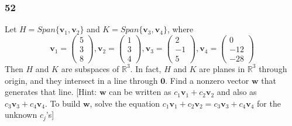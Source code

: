     \subsubsection*{52}
      Let $ H = Span\{\mathbf v_1, \mathbf v_2\} $ and $ K = Span\{\mathbf v_3, \mathbf v_4\}$, where 
      \[
      \mathbf v_1 = \begin{pmatrix}
         5  \\ 
         3  \\ 
         8 
      \end{pmatrix}, 
      \mathbf v_2 = \begin{pmatrix}
         1  \\ 
         3  \\ 
         4 
      \end{pmatrix}, 
      \mathbf v_3 = \begin{pmatrix}
         2  \\ 
         -1  \\ 
         5 
      \end{pmatrix}, 
      \mathbf v_4 = \begin{pmatrix}
         0  \\ 
         -12  \\ 
         -28 
      \end{pmatrix} 
      \]
      Then $ H $ and $ K $ are subspaces of $ \mathbb R^{3} $. In fact, $ H $ and $ K $ are planes in $ \mathbb R^{3} $ through origin, and they intersect in a line through $ \mathbf 0 $. Find a nonzero vector $ \mathbf w $ that generates that line. [Hint: $ \mathbf w $ can be written as $ c_1 \mathbf v_1 + c_2 \mathbf v_2 $ and also as $ c_3 \mathbf v_3 + c_4 \mathbf v_4 $. To build $ \mathbf w $, solve the equation $ c_1 \mathbf v_1 + c_2 \mathbf v_2  = c_3 \mathbf v_3 + c_4 \mathbf v_4  $ for the unknown $ c_j $'s] \newline \newline 




    